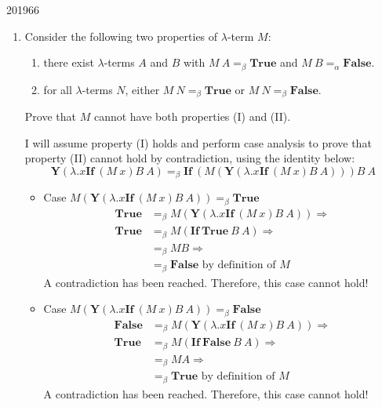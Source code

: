 \documentclass[10pt,\jkfside,a4paper]{article}
\begin{document}
\begin{examquestion}{2019}{6}{6}
\begin{enumerate}
\item Consider the following two properties of $\lambda$-term $M$:
\begin{enumerate}[label=(\Roman*)]

\item there exist $\lambda$-terms $A$ and $B$ with $M\ A =_\beta
\mathbf{True}$ and $M\ B =_\alpha \mathbf{False}$.

\item for all $\lambda$-terms $N$, either $M\ N =_\beta \mathbf{True}$ or
$M\ N =_\beta \mathbf{False}$.

\end{enumerate}

Prove that $M$ cannot have both properties (I) and (II).

I will assume property (I) holds and perform case analysis to prove that
property (II) cannot hold by contradiction, using the
identity below:
\[
\mathbf{Y}(\lambda. x \mathbf{If}\ (M\ x)B\ A) =_{\beta} \mathbf{If}\ (M(\mathbf{Y}(\lambda. x \mathbf{If}\ (M\ x)B\ A)))B\ A
\]
\begin{itemize}


\item Case $M (\mathbf{Y}(\lambda. x \mathbf{If}\ (M\ x)B\ A)) =_\beta
\mathbf{True}$
\begin{align*}
\mathbf{True} &=_\beta
M (\mathbf{Y}(\lambda. x \mathbf{If}\ (M\ x)B\ A)) \Longrightarrow \\
\mathbf{True} &=_\beta
M (\mathbf{If}\ \mathbf{True}\ B\ A) \Longrightarrow \\
&=_{\beta} M B \Longrightarrow \\
&=_{\beta} \mathbf{False} \text{\ by definition of $M$}
\end{align*}
A contradiction has been reached. Therefore, this case cannot hold!

\item Case $M (\mathbf{Y}(\lambda. x \mathbf{If}\ (M\ x)B\ A)) =_\beta
\mathbf{False}$
\begin{align*}
\mathbf{False} &=_\beta
M (\mathbf{Y}(\lambda. x \mathbf{If}\ (M\ x)B\ A)) \Longrightarrow \\
\mathbf{True} &=_\beta
M (\mathbf{If}\ \mathbf{False}\ B\ A) \Longrightarrow \\
&=_{\beta} M A \Longrightarrow \\
&=_{\beta} \mathbf{True} \text{\ by definition of $M$}
\end{align*}
A contradiction has been reached. Therefore, this case cannot hold!


\end{itemize}
\end{enumerate}
\end{examquestion}
\end{document}

